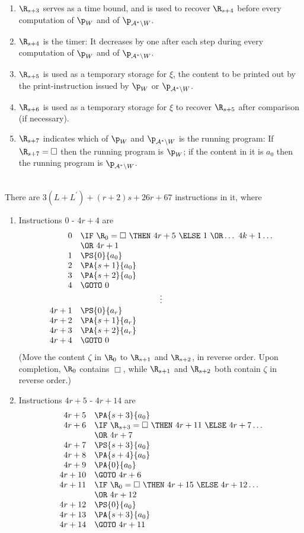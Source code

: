 \begin{enumerate}[1.]
\begin{enumerate}[(a)]
\begin{enumerate}[1)]
\item $\R_{s + 3}$ serves as a time bound, and is used to recover $\R_{s + 4}$ before every computation of $\p_W$ and of $\p_{\mathcal{A}^\ast \setminus W}$.
\item $\R_{s + 4}$ is the timer: It decreases by one after each step during every computation of $\p_W$ and of $\p_{\mathcal{A}^\ast \setminus W}$.
\item $\R_{s + 5}$ is used as a temporary storage for $\xi$, the content to be printed out by the print-instruction issued by $\p_W$ or $\p_{\mathcal{A}^\ast \setminus W}$.
\item $\R_{s + 6}$ is used as a temporary storage for $\xi$ to recover $\R_{s + 5}$ after comparison (if necessary).
\item $\R_{s + 7}$ indicates which of $\p_W$ and $\p_{\mathcal{A}^\ast \setminus W}$ is the running program: If $\R_{s + 7} = \Box$ then the running program is $\p_W$; if the content in it is $a_0$ then the running program is $\p_{\mathcal{A}^\ast \setminus W}$.
\end{enumerate}
\ \\
There are $3(L + L^\prime) + (r + 2)s + 26r + 67$ instructions in it, where
\begin{enumerate}[(1)]
\item Instructions $0$ - $4r + 4$ are
\[
\begin{array}{rl}
0 & \IF \ \R_0 = \Box \ \THEN \ 4r + 5 \ \ELSE \ 1 \ \OR \ldots \ 4k + 1 \ldots \cr
\ & \OR \ 4r + 1 \cr
1 & \PS{0}{a_0} \cr
2 & \PA{s + 1}{a_0} \cr
3 & \PA{s + 2}{a_0} \cr
4 & \GOTO \ 0 \cr
\multicolumn{2}{c}{\vdots} \cr
4r + 1 & \PS{0}{a_r} \cr
4r + 2 & \PA{s + 1}{a_r} \cr
4r + 3 & \PA{s + 2}{a_r} \cr
4r + 4 & \GOTO \ 0 \cr
\end{array}
\]
(Move the content $\zeta$ in $\R_0$ to $\R_{s + 1}$ and $\R_{s + 2}$, in reverse order. Upon completion, $\R_0$ contains $\Box$, while $\R_{s + 1}$ and $\R_{s + 2}$ both contain $\zeta$ in reverse order.)
\item Instructions $4r + 5$ - $4r + 14$ are
\[
\begin{array}{rl}
4r + 5 & \PA{s + 3}{a_0} \cr
4r + 6 & \IF \ \R_{s + 3} = \Box \ \THEN \ 4r + 11 \ \ELSE \ 4r + 7 \ldots \cr
\ & \OR \ 4r + 7 \cr
4r + 7 & \PS{s + 3}{a_0} \cr
4r + 8 & \PA{s + 4}{a_0} \cr
4r + 9 & \PA{0}{a_0} \cr
4r + 10 & \GOTO \ 4r + 6 \cr
4r + 11 & \IF \ \R_0 = \Box \ \THEN \ 4r + 15 \ \ELSE \ 4r + 12 \ldots \cr
\ & \OR \ 4r + 12 \cr
4r + 12 & \PS{0}{a_0} \cr
4r + 13 & \PA{s + 3}{a_0} \cr
4r + 14 & \GOTO \ 4r + 11

\end{array}\]
\end{enumerate}
\end{enumerate}
\end{enumerate}
